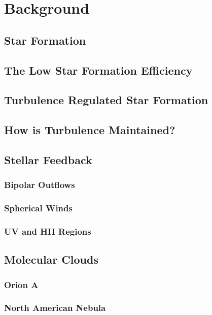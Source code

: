 \section{Background}

\subsection{Star Formation}

\subsection{The Low Star Formation Efficiency}

\subsection{Turbulence Regulated Star Formation}

\subsection{How is Turbulence Maintained?}

\subsection{Stellar Feedback}

\subsubsection{Bipolar Outflows}

\subsubsection{Spherical Winds}

\subsubsection{UV and HII Regions}

\subsection{Molecular Clouds}

\subsubsection{Orion A}

\subsubsection{North American Nebula}
  